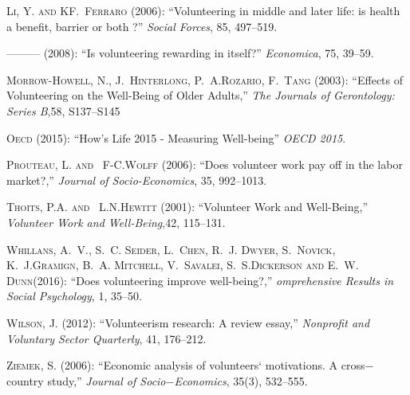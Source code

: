 \documentclass[10pt, letterpaper]{article}
\begin{document}
\begin{spacing}{1.4}
\begin{thebibliography}{87}
\textsc{Li, Y. and KF.~Ferraro} (2006): \enquote{Volunteering in middle and later life: is health a benefit, barrier or both ?} \emph{Social Forces}, 85, 497--519. 


---\hspace{-.1pt}---\hspace{-.1pt}--- (2008{}): \enquote{Is volunteering rewarding in itself?} \emph{Economica}, 75, 39--59.

\textsc{Morrow-Howell, N., J.~Hinterlong, P.~A.Rozario, F.~Tang} (2003):
  \enquote{Effects of Volunteering on the Well-Being of Older Adults,} \emph{The Journals of Gerontology: Series B},58, S137--S145


\textsc{Oecd} (2015): \enquote{How's Life  2015 - Measuring Well-being} \emph{OECD 2015}.
  
\textsc{Prouteau, L. and ~F-C.Wolff } (2006): \enquote{Does volunteer work pay off in the labor market?,} \emph{Journal of Socio-Economics}, 35, 992--1013.

\textsc{Thoits, P.A. and ~L.N.Hewitt } (2001): \enquote{Volunteer Work and Well-Being,} \emph{Volunteer Work and Well-Being},42, 115--131.


\textsc{Whillans, A.~V., S.~C. Seider, L.~Chen, R.~J. Dwyer, S.~Novick, K.~J.Gramign, B.~A. Mitchell, V.~Savalei, S.~S.Dickerson and E.~W. Dunn}(2016):
  \enquote{Does volunteering improve well-being?,} \emph{omprehensive Results in Social Psychology}, 1, 35--50.

  
\textsc{Wilson, J.} (2012): \enquote{Volunteerism research: A
  review essay,} \emph{Nonprofit and Voluntary Sector Quarterly}, 41, 176--212.

\textsc{Ziemek, S.} (2006): \enquote{Economic analysis of volunteers` motivations. A cross$-$country study,} \emph{Journal of Socio$-$Economics}, 35(3), 532--555.



\end{thebibliography}
\end{spacing}
\end{document}
